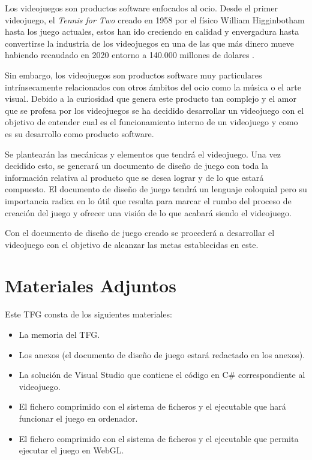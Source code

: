 
Los videojuegos son productos software enfocados al ocio. Desde el primer videojuego, el \textit{Tennis for Two \cite{Tennis4two}} creado en 1958 por el físico William Higginbotham hasta los juego actuales, estos han ido creciendo en calidad y envergadura hasta convertirse la industria de los videojuegos en una de las que más dinero mueve habiendo recaudado en 2020 entorno a 140.000 millones de dolares \cite{2020GamesMoney}.

Sin embargo, los videojuegos son productos software muy particulares intrínsecamente relacionados con otros ámbitos del ocio como la música o el arte visual. Debido a la curiosidad que genera este producto tan complejo y el amor que se profesa por los videojuegos se ha decidido desarrollar un videojuego con el objetivo de entender cual es el funcionamiento interno de un videojuego y como es su desarrollo como producto software.

Se plantearán las mecánicas y elementos que tendrá el videojuego. Una vez decidido esto, se generará un documento de diseño de juego con toda la información relativa al producto que se desea lograr y de lo que estará compuesto. El documento de diseño de juego tendrá un lenguaje coloquial pero su importancia radica en lo útil que resulta para marcar el rumbo del proceso de creación del juego y ofrecer una visión de lo que acabará siendo el videojuego.

Con el documento de diseño de juego creado se procederá a desarrollar el videojuego con el objetivo de alcanzar las metas establecidas en este.

\section{Materiales Adjuntos}
Este TFG consta de los siguientes materiales:
\begin{itemize}
\item
La memoria del TFG.
\item
Los anexos (el documento de diseño de juego estará redactado en los anexos).
\item
La solución de Visual Studio que contiene el código en C\# correspondiente al videojuego.
\item
El fichero comprimido con el sistema de ficheros y el ejecutable que hará funcionar el juego en ordenador.
\item
El fichero comprimido con el sistema de ficheros y el ejecutable que permita ejecutar el juego en WebGL.
\end{itemize}

